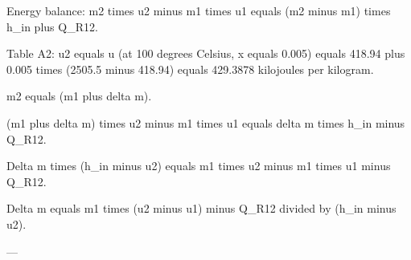 Energy balance:  
m2 times u2 minus m1 times u1 equals (m2 minus m1) times h_in plus Q_R12.  

Table A2:  
u2 equals u (at 100 degrees Celsius, x equals 0.005) equals 418.94 plus 0.005 times (2505.5 minus 418.94) equals 429.3878 kilojoules per kilogram.  

m2 equals (m1 plus delta m).  

(m1 plus delta m) times u2 minus m1 times u1 equals delta m times h_in minus Q_R12.  

Delta m times (h_in minus u2) equals m1 times u2 minus m1 times u1 minus Q_R12.  

Delta m equals m1 times (u2 minus u1) minus Q_R12 divided by (h_in minus u2).  

---